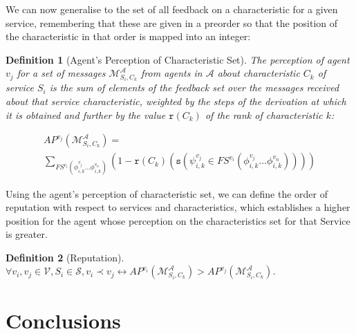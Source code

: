 \documentclass[compsoc, conference, letterpaper, 10pt, times]{IEEEtran}
\newtheorem{definition}{Definition}
\begin{document}
We can now generalise to the set of all feedback on a characteristic for a given service, remembering that these are given in a preorder so that the position of the characteristic in that order is mapped into an integer:


\begin{definition}[Agent's Perception of Characteristic Set]
The perception of agent $v_{j}$ for a set of messages $\mathcal{M}^{\mathcal{A}}_{S_{i},C_{k}}$ from agents in $\mathcal{A}$ about characteristic $C_{k}$ of service $S_{i}$
is the sum of elements of the feedback set over the messages received about that service characteristic, weighted by the steps of the derivation at which it is obtained and further by the value $\mathtt{r}(C_{k})$ of the rank of characteristic $k$: 


\begin{displaymath}
\begin{array}{l}

AP^{v_{j}}(\mathcal{M}^{\mathcal{A}}_{S_{i}, C_{k}})=\\
\sum_{FS^{v_{i}}(\phi^{v_{j}}_{i,k}\dots \phi^{v_{n}}_{i,k})}
(1-\mathtt{r}(C_{k})(\mathtt{s}(\psi^{v_{j}}_{i,k} \in FS^{v_{i}}(\phi^{v_{j}}_{i,k}\dots \phi^{v_{n}}_{i,k}))))
\end{array}
\end{displaymath}

\end{definition}


Using the agent's perception of characteristic set, we can define the order of reputation with respect to services and characteristics, which establishes a higher position for the agent whose perception on the characteristics set for that Service is greater.

\begin{definition}[Reputation]
$\forall v_{i}, v_{j}\in \mathcal{V}, S_{i}\in \mathcal{S}, v_{i}\prec v_{j} \leftrightarrow AP^{v_{i}}(\mathcal{M}^{\mathcal{A}}_{S_{i}, C_{k}})>AP^{v_{j}}(\mathcal{M}^{\mathcal{A}}_{S_{i}, C_{k}})$.
\end{definition}

\section{Conclusions}
\end{document}
